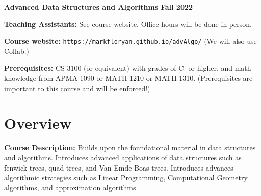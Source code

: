 \documentclass[12pt]{article}
\begin{document}
\textbf{\Large Advanced Data Structures and Algorithms} \hfill \textbf{\Large Fall 2022}

\vskip 0.5in 


\vskip 0.1in
\textbf{Teaching Assistants:} See course website.  Office hours will be done in-person.

\vskip 0.1in
\textbf{Course website:} {\tt https://markfloryan.github.io/advAlgo/} (We will also use Collab.)

\textbf{Prerequisites:} CS 3100 (or equivalent) with grades of C- or higher, and math knowledge from APMA 1090 or MATH 1210 or MATH 1310. (Prerequisites are important to this course and will be enforced!)

\section*{Overview}

\textbf{Course Description:} Builds upon the foundational material in data structures and algorithms. Introduces advanced applications of data structures such as fenwick trees, quad trees, and Van Emde Boas trees. Introduces advances algorithmic strategies such as Linear Programming, Computational Geometry algorithms, and approximation algorithms.
\end{document}
